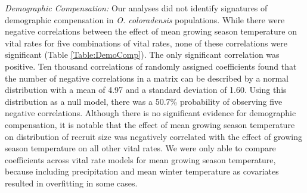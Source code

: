 \documentclass[12pt, letterpaper]{article}
\begin{document}
\textit{Demographic Compensation:} Our analyses did not identify signatures of demographic compensation in \textit{O. coloradensis} populations. While there were negative correlations between the effect of mean growing season temperature on vital rates for five combinations of vital rates, none of these correlations were significant (Table \ref{Table:DemoComp}). The only significant correlation was positive. Ten thousand correlations of randomly assigned coefficients found that the number of negative correlations in a matrix can be described by a normal distribution with a mean of 4.97 and a standard deviation of 1.60. Using this distribution as a null model, there was a 50.7\% probability of observing five negative correlations. Although there is no significant evidence for demographic compensation, it is notable that the effect of mean growing season temperature on distribution of recruit size was negatively correlated with the effect of growing season temperature on all other vital rates. We were only able to compare coefficients across vital rate models for mean growing season temperature, because including precipitation and mean winter temperature as covariates resulted in overfitting in some cases.  
\end{document}
